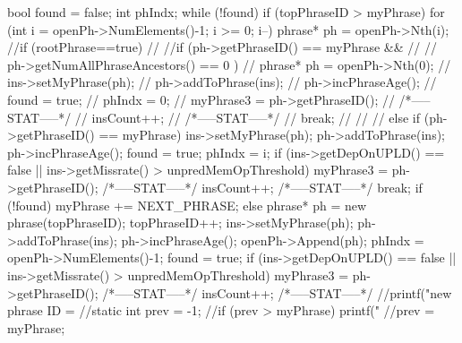 \begin{DoxyCode}
{        bool found = false;
        int phIndx;
        while (!found) {
                if (topPhraseID > myPhrase) {
                        for (int i = openPh->NumElements()-1; i >= 0; i--) {
                                phrase* ph = openPh->Nth(i);
                                //if (rootPhrase==true) {
                                //      //if (ph->getPhraseID() == myPhrase && 
                                //      //    ph->getNumAllPhraseAncestors() == 0
      ) {
                                //              phrase* ph = openPh->Nth(0);
                                //              ins->setMyPhrase(ph);
                                //              ph->addToPhrase(ins);
                                //              ph->incPhraseAge();
                                //              found = true;
                                //              phIndx = 0;
                                //              myPhrase3 = ph->getPhraseID();
                                //              /*-----STAT-----*/
                                //              insCount++;
                                //              /*-----STAT-----*/
                                //              break;
                                //      //}
                                //} else 
                                if (ph->getPhraseID() == myPhrase) {
                                        ins->setMyPhrase(ph);
                                        ph->addToPhrase(ins);
                                        ph->incPhraseAge();
                                        found = true;
                                        phIndx = i;
                                        if (ins->getDepOnUPLD() == false ||
                                            ins->getMissrate() > 
      unpredMemOpThreshold) 
                                                myPhrase3 = ph->getPhraseID();
                                        /*-----STAT-----*/
                                        insCount++;
                                        /*-----STAT-----*/
                                        break;
                                }
                        }
                        if (!found) {
                                myPhrase += NEXT_PHRASE;
                        }
                } else {
                        phrase* ph = new phrase(topPhraseID);
                        topPhraseID++;
                        ins->setMyPhrase(ph);
                        ph->addToPhrase(ins);
                        ph->incPhraseAge();
                        openPh->Append(ph);
                        phIndx = openPh->NumElements()-1;
                        found = true;
                        if (ins->getDepOnUPLD() == false ||
                            ins->getMissrate() > unpredMemOpThreshold) 
                                myPhrase3 = ph->getPhraseID();
                        /*-----STAT-----*/
                        insCount++;
                        /*-----STAT-----*/
                        //printf("new phrase ID = %
                }
        }
        //static int prev = -1;
        //if (prev > myPhrase) printf("%
        //prev = myPhrase;

}
\end{DoxyCode}
